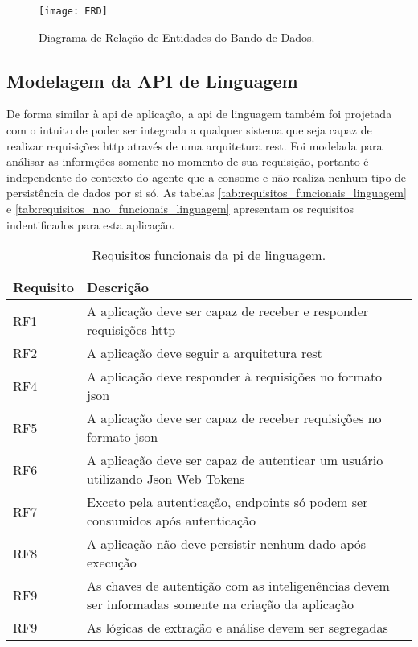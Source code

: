 \begin{figure}[htb]
  \captionsetup{width=0.43\textwidth}
  \caption{Diagrama de Relação de Entidades do Bando de Dados.}
  \label{fig:ERD}
  \texttt{[image: ERD]}
  \fonte{}
\end{figure}

\subsection{Modelagem da API de Linguagem}\label{subsec:modelagem_linguagem}

De forma similar à \gls{api} de aplicação, a \gls{api} de linguagem também foi projetada com o intuito de poder ser integrada a qualquer sistema que seja capaz de realizar requisições \gls{http} através de uma arquitetura \gls{rest}. Foi modelada para análisar as informções somente no momento de sua requisição, portanto é independente do contexto do agente que a consome e não realiza nenhum tipo de persistência de dados por si só. As tabelas \autoref{tab:requisitos_funcionais_linguagem} e \autoref{tab:requisitos_nao_funcionais_linguagem} apresentam os requisitos indentificados para esta aplicação.

\begin{table}[htb]
  \caption{Requisitos funcionais da pi de linguagem.}
  \label{tab:requisitos_funcionais_linguagem}
  \begin{tabularx}{\textwidth}{l|l}
    \hline
    \textbf{Requisito} & \textbf{Descrição}                                                             \\ \hline
    RF1                & A aplicação deve ser capaz de receber e responder requisições \gls{http}       \\
    RF2                & A aplicação deve seguir a arquitetura \gls{rest}                               \\
    RF4                & A aplicação deve responder à requisições no formato \gls{json}                 \\
    RF5                & A aplicação deve ser capaz de receber requisições no formato \gls{json}        \\
    RF6                & A aplicação deve ser capaz de autenticar um usuário utilizando Json Web Tokens \\
    RF7                & Exceto pela autenticação, endpoints só podem ser consumidos após autenticação  \\
    RF8                & A aplicação não deve persistir nenhum dado após execução                       \\
    RF9                & As chaves de autentição com as inteligenências devem ser informadas
    somente na criação da aplicação                                                                     \\
    RF9                & As lógicas de extração e análise devem ser segregadas                          \\ \hline
  \end{tabularx}
  \fonte{}
\end{table}

